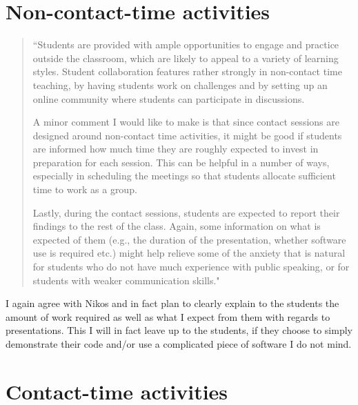 \documentclass[a4paper,12pt]{article}
\begin{document}
\section{Non-contact-time activities}

\begin{quote}
``Students are provided with ample opportunities to engage and practice outside the classroom, which are likely to appeal to a variety of learning styles. Student collaboration features rather strongly in non-contact time teaching, by having students work on challenges and by setting up an online community where students can participate in discussions.

A minor comment I would like to make is that since contact sessions are designed around non-contact time activities, it might be good if students are informed how much time they are roughly expected to invest in preparation for each session. This can be helpful in a number of ways, especially in scheduling the meetings so that students allocate sufficient time to work as a group.

Lastly, during the contact sessions, students are expected to report their findings to the rest of the class. Again, some information on what is expected of them (e.g., the duration of the presentation, whether software use is required etc.) might help relieve some of the anxiety that is natural for students who do not have much experience with public speaking, or for students with weaker communication skills."
\end{quote}

I again agree with Nikos and in fact plan to clearly explain to the students the amount of work required as well as what I expect from them with regards to presentations. This I will in fact leave up to the students, if they choose to simply demonstrate their code and/or use a complicated piece of software I do not mind.

\section{Contact-time activities}
\end{document}
